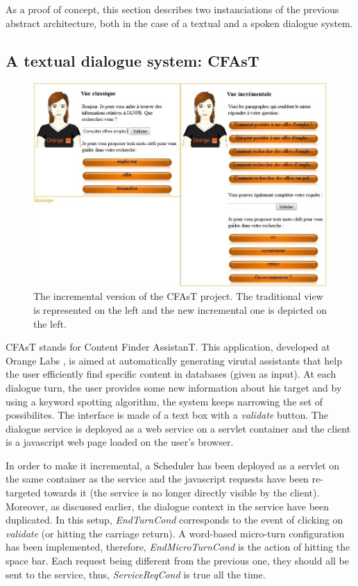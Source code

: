         As a proof of concept, this section describes two instanciations of the previous abstract architecture, both in the case of a textual and a spoken dialogue system.

	\subsection{A textual dialogue system: CFAsT}
    
    	\begin{figure}[ht]
          \centering
          \includegraphics[scale=0.6]{figures/CFAsTIncr.jpg}
          \caption{The incremental version of the CFAsT project. The traditional view is represented on the left and the new incremental one is depicted on the left.}
          \label{fig:CFAsTIncr}
        \end{figure}
        
        CFAsT stands for Content Finder AssistanT. This application, developed at Orange Labs \cite{Laroche2014,Laroche2015}, is aimed at automatically generating virutal assistants that help the user efficiently find specific content in databases (given as input). At each dialogue turn, the user provides some new information about his target and by using a keyword spotting algorithm, the system keeps narrowing the set of possibilites. The interface is made of a text box with a \textit{validate} button. The dialogue service is deployed as a web service on a servlet container and the client is a javascript web page loaded on the user's browser.
        
        In order to make it incremental, a Scheduler has been deployed as a servlet on the same container as the service and the javascript requests have been re-targeted towards it (the service is no longer directly visible by the client). Moreover, as discussed earlier, the dialogue context in the service have been duplicated. In this setup, \textit{EndTurnCond} corresponds to the event of clicking on \textit{validate} (or hitting the carriage return). A word-based micro-turn configuration has been implemented, therefore, \textit{EndMicroTurnCond} is the action of hitting the space bar. Each request being different from the previous one, they should all be sent to the service, thus, \textit{ServiceReqCond} is true all the time.
        
